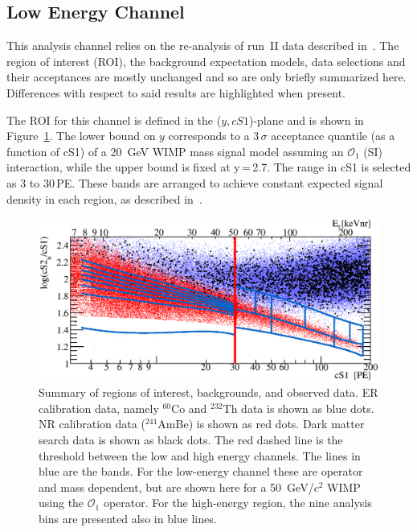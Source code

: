 
\subsection{Low Energy Channel}
\label{subsec:LowE}
This analysis channel relies on the re-analysis of run~II data described in~\cite{xe100_run_combination}. The region of interest (ROI), the background 
expectation models, data selections and their acceptances are mostly unchanged and so are only briefly summarized here. Differences with respect to said results are highlighted when present.

The ROI for this channel is defined in the ($y,cS1$)-plane and is shown in Figure~\ref{fig:phasespace}.  The lower 
bound on $y$ corresponds to a 3\,$\sigma$ acceptance quantile (as a function of cS1) of a 20~GeV WIMP mass signal model assuming an $\mathcal{O}_1$ (SI) interaction, while the upper bound is fixed at y\,=\,2.7.
The range in cS1 is selected as 3 to 30\,PE. 
These bands are arranged to achieve constant expected signal density in each region, as described in~\cite{xe100_run_combination}.

\begin{figure}[]
\begin{minipage}{1\linewidth}
\centerline{\includegraphics[width=1\linewidth]{Figures/eft_sr.eps}}
\end{minipage}
\caption{Summary of regions of interest, backgrounds, and observed data. ER calibration data, namely $^{60}\mathrm{Co}$ and $^{232}\mathrm{Th}$ data is shown as blue dots. NR calibration data ($^{241}$AmBe) is shown as red dots. Dark matter search data is shown as black dots. The red dashed line is the threshold between the low and high energy channels. The lines in blue are the bands. For the low-energy channel these are operator and mass dependent, but are shown here for a 50~GeV/$c^2$ WIMP using the $\mathcal{O}_1$ operator. For the high-energy region, the nine analysis bins are presented also in blue lines.
}
\label{fig:phasespace}
\end{figure}  


